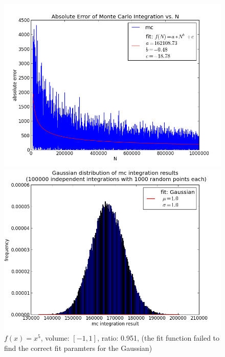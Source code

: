 \documentclass[12pt,a4paper,titlepage]{article}
\begin{document}
\begin{figure}
	\centering
	\caption{$f(x)=x^5$, volume: $[-1,1]$, ratio: 0.951, (the fit function failed to find the correct fit paramters for the Gaussian)}
	\begin{minipage}[b]{\linewidth}
		\centering
		\includegraphics[width=\linewidth]{Plots/x5}
	\end{minipage}
	\begin{minipage}[b]{\linewidth}
		\centering
		\includegraphics[width=\linewidth]{Plots/x5_HIST}
	\end{minipage}
	\label{fig:linear}
\end{figure}
\end{document}
